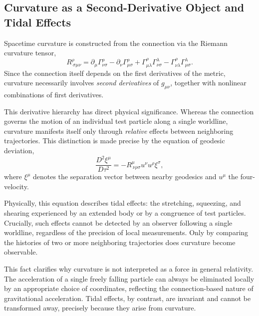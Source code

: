 \documentclass[12pt,letterpaper]{article}
\begin{document}
\subsection{Curvature as a Second-Derivative Object and Tidal Effects}

Spacetime curvature is constructed from the connection via the Riemann curvature tensor,
\begin{equation}
R^\rho_{\ \sigma\mu\nu}
=
\partial_\mu \Gamma^\rho_{\nu\sigma}
-
\partial_\nu \Gamma^\rho_{\mu\sigma}
+
\Gamma^\rho_{\mu\lambda} \Gamma^\lambda_{\nu\sigma}
-
\Gamma^\rho_{\nu\lambda} \Gamma^\lambda_{\mu\sigma}.
\end{equation}
Since the connection itself depends on the first derivatives of the metric, curvature necessarily involves \emph{second derivatives} of $g_{\mu\nu}$, together with nonlinear combinations of first derivatives.

This derivative hierarchy has direct physical significance.
Whereas the connection governs the motion of an individual test particle along a single worldline, curvature manifests itself only through \emph{relative} effects between neighboring trajectories.
This distinction is made precise by the equation of geodesic deviation,
\begin{equation}
\frac{D^2 \xi^\mu}{D\tau^2}
=
- R^\mu_{\ \nu\rho\sigma}
u^\nu u^\rho \xi^\sigma,
\end{equation}
where $\xi^\mu$ denotes the separation vector between nearby geodesics and $u^\mu$ the four-velocity.

Physically, this equation describes tidal effects: the stretching, squeezing, and shearing experienced by an extended body or by a congruence of test particles.
Crucially, such effects cannot be detected by an observer following a single worldline, regardless of the precision of local measurements.
Only by comparing the histories of two or more neighboring trajectories does curvature become observable.

This fact clarifies why curvature is not interpreted as a force in general relativity.
The acceleration of a single freely falling particle can always be eliminated locally by an appropriate choice of coordinates, reflecting the connection-based nature of gravitational acceleration.
Tidal effects, by contrast, are invariant and cannot be transformed away, precisely because they arise from curvature.
\end{document}
